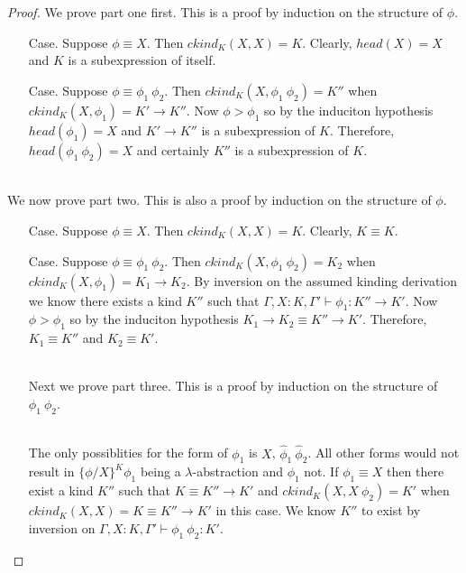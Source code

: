 \begin{proof}
  We prove part one first. This is a proof by induction on the structure of $\phi$.

\begin{itemize}
\item[Case.] Suppose $\phi \equiv X$.  Then $ckind_K(X,X) = K$.  Clearly,
  $head(X) = X$ and $K$ is a subexpression of itself.
  
\item[Case.] Suppose $\phi \equiv \phi_1\ \phi_2$.  Then $ckind_K(X,\phi_1\ \phi_2) = K''$
  when $ckind_K(X,\phi_1) = K' \to K''$.  Now $\phi > \phi_1$ so by the induciton
  hypothesis $head(\phi_1) = X$ and $K' \to K''$ is a subexpression of $K$.
  Therefore, $head(\phi_1\ \phi_2) = X$ and certainly $K''$ is a subexpression of $K$.
\end{itemize}

\ \\
We now prove part two.  This is also a proof by induction on the structure of $\phi$.

\begin{itemize}
\item[Case.] Suppose $\phi \equiv X$.  Then $ckind_K(X,X) = K$.  Clearly,
  $K \equiv K$.
  
\item[Case.] Suppose $\phi \equiv \phi_1\ \phi_2$.  Then $ckind_K(X,\phi_1\ \phi_2) = K_2$
  when $ckind_K(X,\phi_1) = K_1 \to K_2$.  By inversion on the assumed kinding
  derivation we know there exists a kind $K''$ such that $\Gamma,X:K,\Gamma' \vdash \phi_1:K'' \to K'$.
  Now $\phi > \phi_1$ so by the induciton hypothesis $K_1 \to K_2 \equiv K'' \to K'$.
  Therefore, $K_1 \equiv K''$ and $K_2 \equiv K'$.

\ \\
Next we prove part three.  This is a proof by induction on the structure of $\phi_1\ \phi_2$.

\ \\
The only possiblities for the form of $\phi_1$ is $X$, $\hat{\phi}_1\ \hat{\phi}_2$.  All other 
forms would not result in $\{\phi/X\}^K \phi_1$ being a $\lambda$-abstraction and $\phi_1$ not.
If $\phi_1 \equiv X$ then there exist a kind $K''$ such that $K \equiv K'' \to K'$ and
$ckind_K(X,X\ \phi_2) = K'$ when $ckind_K(X,X) = K \equiv K'' \to K'$ in this case.  We know
$K''$ to exist by inversion on $\Gamma,X:K,\Gamma' \vdash \phi_1\ \phi_2:K'$.


\end{itemize}
\end{proof}

